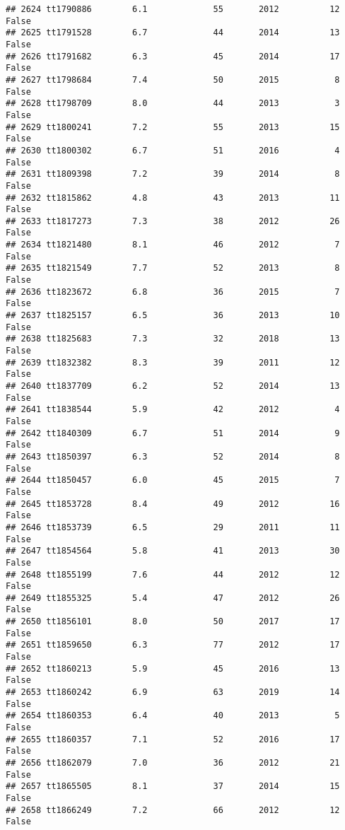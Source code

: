 \documentclass[
]{article}
\begin{document}
\begin{verbatim}
## 2624 tt1790886        6.1             55       2012          12   False
## 2625 tt1791528        6.7             44       2014          13   False
## 2626 tt1791682        6.3             45       2014          17   False
## 2627 tt1798684        7.4             50       2015           8   False
## 2628 tt1798709        8.0             44       2013           3   False
## 2629 tt1800241        7.2             55       2013          15   False
## 2630 tt1800302        6.7             51       2016           4   False
## 2631 tt1809398        7.2             39       2014           8   False
## 2632 tt1815862        4.8             43       2013          11   False
## 2633 tt1817273        7.3             38       2012          26   False
## 2634 tt1821480        8.1             46       2012           7   False
## 2635 tt1821549        7.7             52       2013           8   False
## 2636 tt1823672        6.8             36       2015           7   False
## 2637 tt1825157        6.5             36       2013          10   False
## 2638 tt1825683        7.3             32       2018          13   False
## 2639 tt1832382        8.3             39       2011          12   False
## 2640 tt1837709        6.2             52       2014          13   False
## 2641 tt1838544        5.9             42       2012           4   False
## 2642 tt1840309        6.7             51       2014           9   False
## 2643 tt1850397        6.3             52       2014           8   False
## 2644 tt1850457        6.0             45       2015           7   False
## 2645 tt1853728        8.4             49       2012          16   False
## 2646 tt1853739        6.5             29       2011          11   False
## 2647 tt1854564        5.8             41       2013          30   False
## 2648 tt1855199        7.6             44       2012          12   False
## 2649 tt1855325        5.4             47       2012          26   False
## 2650 tt1856101        8.0             50       2017          17   False
## 2651 tt1859650        6.3             77       2012          17   False
## 2652 tt1860213        5.9             45       2016          13   False
## 2653 tt1860242        6.9             63       2019          14   False
## 2654 tt1860353        6.4             40       2013           5   False
## 2655 tt1860357        7.1             52       2016          17   False
## 2656 tt1862079        7.0             36       2012          21   False
## 2657 tt1865505        8.1             37       2014          15   False
## 2658 tt1866249        7.2             66       2012          12   False

\end{verbatim}
\end{document}
